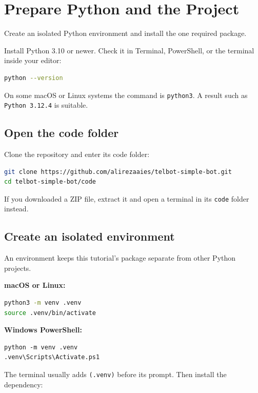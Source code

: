 \chapter{Prepare Python and the Project}

\begin{goalbox}
Create an isolated Python environment and install the one required package.
\end{goalbox}

Install Python 3.10 or newer. Check it in Terminal, PowerShell, or the terminal
inside your editor:

\begin{lstlisting}[language=bash,numbers=none]
python --version
\end{lstlisting}

On some macOS or Linux systems the command is \texttt{python3}. A result such as
\texttt{Python 3.12.4} is suitable.

\section{Open the code folder}

Clone the repository and enter its code folder:

\begin{lstlisting}[language=bash,numbers=none]
git clone https://github.com/alirezaaies/telbot-simple-bot.git
cd telbot-simple-bot/code
\end{lstlisting}

If you downloaded a ZIP file, extract it and open a terminal in its \texttt{code}
folder instead.

\section{Create an isolated environment}

An environment keeps this tutorial's package separate from other Python projects.

\textbf{macOS or Linux:}
\begin{lstlisting}[language=bash,numbers=none]
python3 -m venv .venv
source .venv/bin/activate
\end{lstlisting}

\textbf{Windows PowerShell:}
\begin{lstlisting}[language={},numbers=none]
python -m venv .venv
.venv\Scripts\Activate.ps1
\end{lstlisting}

The terminal usually adds \texttt{(.venv)} before its prompt. Then install the
dependency:

